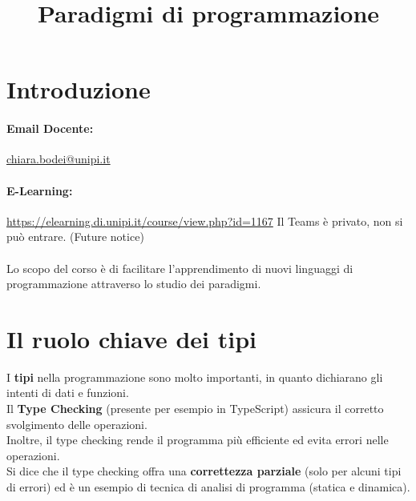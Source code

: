\documentclass[12pt,a4paper]{article}
\title{Paradigmi di programmazione}
\author{}
\date{}
\let\oldsection\section
\renewcommand{\section}{\clearpage\oldsection}
\begin{document}
\maketitle
\tableofcontents

\section{Introduzione}
\paragraph{Email Docente:} \href{chiara.bodei@unipi.it}{chiara.bodei@unipi.it}
\paragraph{E-Learning:} \href{https://elearning.di.unipi.it/course/view.php?id=1167}{https://elearning.di.unipi.it/course/view.php?id=1167}
Il Teams è privato, non si può entrare. (Future notice)\\\\
Lo scopo del corso è di facilitare l'apprendimento di nuovi linguaggi di programmazione attraverso lo studio dei paradigmi.

\section{Il ruolo chiave dei tipi}
I \textbf{tipi} nella programmazione sono molto importanti, in quanto dichiarano gli intenti di dati e funzioni.\\
Il \textbf{Type Checking} (presente per esempio in TypeScript) assicura il corretto svolgimento delle operazioni.\\
Inoltre, il type checking rende il programma più efficiente ed evita errori nelle operazioni.\\
Si dice che il type checking offra una \textbf{correttezza parziale} (solo per alcuni tipi di errori) ed è un esempio di tecnica di analisi di programma (statica e dinamica).
\end{document}
